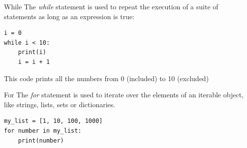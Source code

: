 \documentclass[aspectratio=169,]{beamer}
\begin{document}
\begin{frame}[fragile]{While}
    The \emph{while} statement is used to repeat the execution of a suite of statements as long as an expression is
    true:

    \begin{minipage}{0.49\textwidth}
        \begin{verbatim}
i = 0
while i < 10:
    print(i)
    i = i + 1
        \end{verbatim}
    \end{minipage}
    \begin{minipage}{0.49\textwidth}
    \end{minipage}

    This code prints all the numbers from 0 (included) to 10 (excluded)
\end{frame}

\begin{frame}[fragile]{For}
    The \emph{for} statement is used to iterate over the elements of an iterable object, like strings, lists, sets or
    dictionaries.

    \begin{verbatim}
my_list = [1, 10, 100, 1000]
for number in my_list:
    print(number)
    \end{verbatim}
\end{frame}

%
\end{document}
